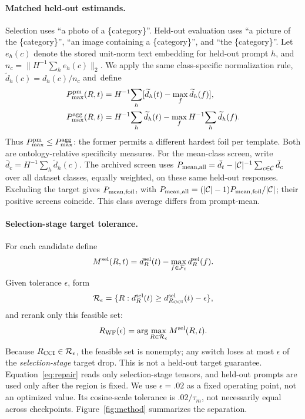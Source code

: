 \documentclass[10pt]{article}
\newcommand{\dropv}{d}
\newcommand{\foils}{\mathcal{F}}
\newcommand{\regions}{\mathcal{R}}
\begin{document}
\paragraph{Matched held-out estimands.}
Selection uses ``a photo of a \{category\}''. Held-out evaluation uses
``a picture of the \{category\}'', ``an image containing a \{category\}'', and
``the \{category\}''. Let $e_h(c)$ denote the stored unit-norm text embedding
for held-out prompt $h$, and
$n_c=\|H^{-1}\sum_h e_h(c)\|_2$.
We apply the same class-specific normalization rule,
$\widetilde d_h(c)=d_h(c)/n_c$ and~define
\begin{equation}
\begin{aligned}
P_{\max}^{\rm pm}(R,t)
&=H^{-1}\!\sum_h[\widetilde d_h(t)-\max_f\widetilde d_h(f)],\\
P_{\max}^{\rm agg}(R,t)
&=H^{-1}\!\sum_h\widetilde d_h(t)-
\max_f H^{-1}\!\sum_h\widetilde d_h(f).
\end{aligned}
\label{eq:estimands}
\end{equation}
Thus $P_{\max}^{\rm pm}\le P_{\max}^{\rm agg}$: the former permits a different
hardest foil per template. Both are ontology-relative specificity measures.
For the mean-class screen, write $\bar d_c=H^{-1}\sum_h\widetilde d_h(c)$.
The archived screen uses $P_{\rm mean,all}=\bar d_t-|\mathcal C|^{-1}\sum_{c\in\mathcal C}\bar d_c$
over all dataset classes, equally weighted, on these same held-out responses.
Excluding the target gives $P_{\rm mean,foil}$, with
$P_{\rm mean,all}=(|\mathcal C|-1)P_{\rm mean,foil}/|\mathcal C|$;
their positive screens coincide. This class average differs from prompt-mean.

\paragraph{Selection-stage target tolerance.}
For each candidate define
\begin{equation}
M^{\rm sel}(R,t)=\dropv_R^{\rm sel}(t)-
\max_{f\in\foils_t}\dropv_R^{\rm sel}(f).
\end{equation}
Given tolerance $\epsilon$, form
\begin{equation}
\regions_\epsilon=\{R:\dropv_R^{\rm sel}(t)\ge
\dropv_{R_{\rm CCI}}^{\rm sel}(t)-\epsilon\},
\end{equation}
and rerank only this feasible set:
\begin{equation}
R_{\rm WF}(\epsilon)=\arg\max_{R\in\regions_\epsilon}M^{\rm sel}(R,t).
\label{eq:repair}
\end{equation}
Because $R_{\rm CCI}\in\regions_\epsilon$, the feasible set is nonempty;
any switch loses at most $\epsilon$ of the \emph{selection-stage} target drop.
This is not a held-out target guarantee. Equation~\ref{eq:repair} reads only
selection-stage tensors, and held-out prompts are used only after the region is
fixed. We use $\epsilon=.02$ as a fixed operating point, not an optimized value.
Its cosine-scale tolerance is $.02/\tau_m$, not necessarily equal across checkpoints.
Figure~\ref{fig:method} summarizes the separation.
\end{document}
